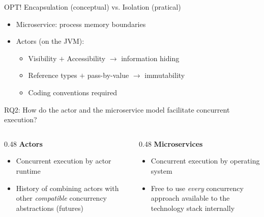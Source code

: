 \documentclass{beamer}
\begin{document}

\begin{frame}{OPT! Encapsulation (conceptual) vs. Isolation (pratical)}

\begin{itemize}
  \item Microservice: process memory boundaries
  \item Actors (on the JVM):
  \begin{itemize}
    \item Visibility $+$ Accessibility $\rightarrow$ information hiding
    \item Reference types $+$ pass-by-value $\rightarrow$ immutability
    \item Coding conventions required
  \end{itemize}
\end{itemize}

\end{frame}


\begin{frame}{RQ2: How do the actor and the microservice model facilitate concurrent execution?}

\begin{columns}
  \begin{column} {0.48\textwidth} 
    \textbf{Actors}
    \begin{itemize}
      \item Concurrent execution by actor runtime
      \item History of combining actors with other \textit{compatible} concurrency abstractions (futures)
    \end{itemize}
  \end{column}
  \begin{column} {0.48\textwidth}
    \textbf{Microservices} \\
    \begin{itemize}
      \item Concurrent execution by operating system
      \item Free to use \textit{every} concurrency approach available to the technology stack internally
    \end{itemize}
  \end{column}
\end{columns}

\end{frame}
\end{document}

